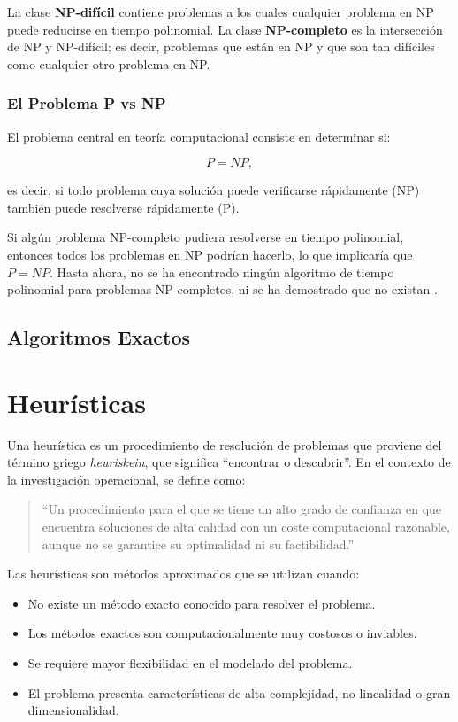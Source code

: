 \documentclass[12pt,titlepage,twoside,openright]{book}
\begin{document}
La clase \textbf{NP-difícil} contiene problemas a los cuales cualquier problema en NP puede reducirse en tiempo polinomial. La clase \textbf{NP-completo} es la intersección de NP y NP-difícil; es decir, problemas que están en NP y que son tan difíciles como cualquier otro problema en NP.

\subsubsection{El Problema P vs NP}

El problema central en teoría computacional consiste en determinar si:

\[
	P = NP,
\]

es decir, si todo problema cuya solución puede verificarse rápidamente (NP) también puede resolverse rápidamente (P).

Si algún problema NP-completo pudiera resolverse en tiempo polinomial, entonces todos los problemas en NP podrían hacerlo, lo que implicaría que \(P = NP\). Hasta ahora, no se ha encontrado ningún algoritmo de tiempo polinomial para problemas NP-completos, ni se ha demostrado que no existan \citep{madiPvsNP}.

\subsection{Algoritmos Exactos}
\section{Heurísticas}

Una heurística es un procedimiento de resolución de problemas que proviene del término griego \textit{heuriskein}, que significa ``encontrar o descubrir''. En el contexto de la investigación operacional, se define como:

\begin{quote}
    ``Un procedimiento para el que se tiene un alto grado de confianza en que encuentra soluciones de alta calidad con un coste computacional razonable, aunque no se garantice su optimalidad ni su factibilidad.'' \citep{antonioSuarez2014}
\end{quote}


Las heurísticas son métodos aproximados que se utilizan cuando:

\begin{itemize}
    \item No existe un método exacto conocido para resolver el problema.
    \item Los métodos exactos son computacionalmente muy costosos o inviables.
    \item Se requiere mayor flexibilidad en el modelado del problema.
    \item El problema presenta características de alta complejidad, no linealidad o gran dimensionalidad.
\end{itemize}
\end{document}
